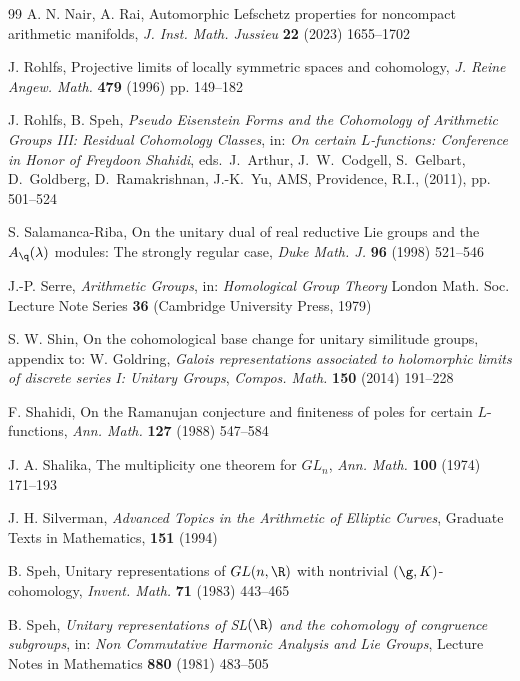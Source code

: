 \begin{thebibliography}{99}
 A. N. Nair, A. Rai, Automorphic Lefschetz properties for noncompact arithmetic manifolds, {\it J. Inst. Math. Jussieu} {\bf 22} (2023) 1655--1702


 J. Rohlfs, Projective limits of locally symmetric spaces and cohomology, {\it J. Reine Angew. Math.} \textbf{479} (1996) pp. 149--182

 J. Rohlfs, B. Speh, {\it Pseudo Eisenstein Forms and the Cohomology of Arithmetic Groups III: Residual Cohomology Classes}, in: {\it On certain $L$-functions: Conference in Honor of Freydoon Shahidi}, eds.\ J.\ Arthur, J.\ W.\ Codgell, S.\ Gelbart, D.\ Goldberg, D.\ Ramakrishnan, J.-K.\ Yu, AMS, Providence, R.I., (2011), pp. 501--524


 S. Salamanca-Riba, On the unitary dual of real reductive Lie groups and the $A_\q(\lambda)$ modules: The strongly regular case, {\it Duke Math. J.} {\bf 96} (1998) 521--546


 J.-P. Serre, {\it Arithmetic Groups}, in: {\it Homological Group Theory} London Math. Soc. Lecture Note Series {\bf 36} (Cambridge University Press, 1979)


 S. W. Shin, On the cohomological base change for unitary similitude groups, appendix to: W. Goldring, {\it Galois representations associated to holomorphic limits of discrete series I: Unitary Groups}, {\it Compos. Math.} {\bf 150} (2014) 191--228

 F. Shahidi, On the Ramanujan conjecture and finiteness of poles for certain $L$-functions, {\it Ann. Math.} \textbf{127} (1988) 547--584

 J. A. Shalika, The multiplicity one theorem for $GL_n$, {\it Ann. Math.} \textbf{100} (1974) 171--193

 J. H. Silverman, \emph{Advanced Topics in the Arithmetic of Elliptic Curves}, Graduate Texts in Mathematics, {\bf 151} (1994)

 B. Speh, Unitary representations of $GL(n,\R)$ with nontrivial $(\g,K)$-cohomology, {\it Invent. Math.} {\bf 71} (1983) 443--465

 B. Speh, {\it Unitary representations of SL$(\R)$ and the cohomology of congruence subgroups}, in: {\it Non Commutative Harmonic Analysis and Lie Groups}, Lecture Notes in Mathematics {\bf 880} (1981) 483--505



\end{thebibliography}
